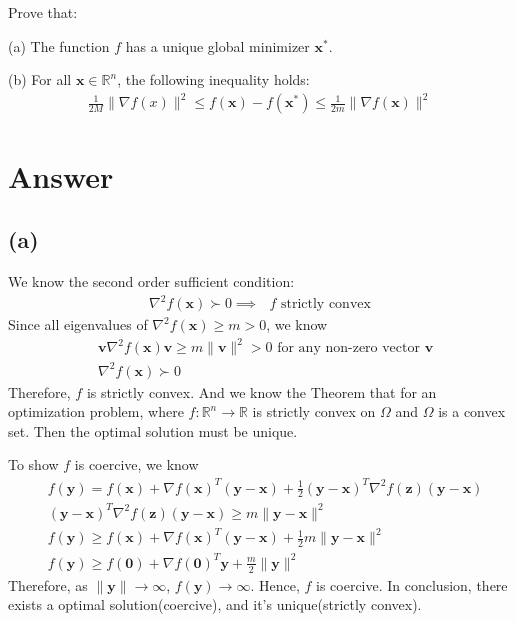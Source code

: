\documentclass{article}
\newcommand{\R}{\mathbb{R}}
\begin{document}
Prove that:

(a) The function \(f\) has a unique global minimizer \(\bm{x}^{*}\).

(b) For all \(\bm{x} \in \R^n\), the following inequality holds:
\begin{align*}
    \frac{1}{2M} \|\nabla f(x)\|^2 \leq f(\bm{x}) - f(\bm{x}^*) \leq \frac{1}{2m} \|\nabla f(\bm{x})\|^2
\end{align*}

\section*{Answer}
\subsection*{(a)}
We know the second order sufficient condition:
\begin{align*}
    \nabla^2 f(\bm{x}) \succ 0 \implies \text{ \(f\) strictly convex}
\end{align*}
Since all eigenvalues of \(\nabla^2 f(\bm{x}) \geq m > 0\), we know
\begin{align*}
    &\bm{v} \nabla^2 f(\bm{x}) \bm{v} \geq m\|\bm{v}\|^2 > 0 \text{ for any non-zero vector \(\bm{v}\)}  \\
    &\nabla^2 f(\bm{x}) \succ 0
\end{align*} 
Therefore, \(f\) is strictly convex.
And we know the Theorem that for an optimization problem, where \(f: \R^n \to \R\) is strictly convex on \(\Omega\) and \(\Omega\) is a convex set. Then the optimal solution must be unique.

To show \(f\) is coercive, we know
\begin{align*}
    &f(\bm{y}) = f(\bm{x}) + \nabla f(\bm{x})^T (\bm{y} - \bm{x}) + \frac{1}{2} (\bm{y} - \bm{x})^T \nabla^2 f(\bm{z}) (\bm{y} - \bm{x}) \\
    &(\bm{y} - \bm{x})^T \nabla^2 f(\bm{z}) (\bm{y} - \bm{x}) \geq m \|\bm{y} - \bm{x}\|^2 \\
    &f(\bm{y}) \geq f(\bm{x}) + \nabla f(\bm{x})^T (\bm{y} - \bm{x}) + \frac{1}{2} m \|\bm{y} - \bm{x}\|^2  \\
    &f(\bm{y}) \geq f(\bm{0}) + \nabla f(\bm{0})^T \bm{y} + \frac{m}{2} \|\bm{y}\|^2
\end{align*}
Therefore, as \(\|\bm{y}\| \to \infty\), \(f(\bm{y}) \to \infty\). Hence, \(f\) is coercive.
In conclusion, there exists a optimal solution(coercive), and it's unique(strictly convex).
\end{document}
